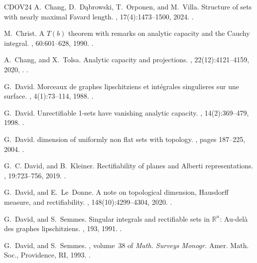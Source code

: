 \documentclass[11pt,reqno]{amsart}
\theoremstyle{definition}
\theoremstyle{remark}
\numberwithin{equation}{section}
\theoremstyle{theorem}
\theoremstyle{definition}
\theoremstyle{remark}
\numberwithin{equation}{section}
\begin{document}
\begin{thebibliography}{CDOV24}
	A.~Chang, D.~D{\k{a}}browski, T.~Orponen, and M.~Villa.
	\newblock Structure of sets with nearly maximal {Favard} length.
	, 17(4):1473--1500, 2024.
	\newblock {}.
	
	M.~Christ.
	\newblock A {$T(b)$} theorem with remarks on analytic capacity and the {Cauchy}
	integral.
	, 60:601--628, 1990.
	\newblock {}.
	
	A.~Chang, and X.~Tolsa.
	\newblock Analytic capacity and projections.
	, 22(12):4121--4159, 2020,
	.
	\newblock {}.
	
	G.~David.
	\newblock Morceaux de graphes lipschitziens et int{\'e}grales singulieres sur
	une surface.
	, 4(1):73--114, 1988.
	\newblock {}.
	
	G.~David.
	\newblock Unrectifiable 1-sets have vanishing analytic capacity.
	, 14(2):369--479, 1998.
	\newblock {}.
	
	G.~David.
	 dimension of uniformly non flat sets with topology.
	, pages 187--225, 2004.
	\newblock {}.
	
	G.~C. David, and B.~Kleiner.
	\newblock Rectifiability of planes and {Alberti representations}.
	, 19:723--756, 2019.
	\newblock {}.
	
	G.~David, and E.~Le~Donne.
	\newblock A note on topological dimension, {Hausdorff measure}, and
	rectifiability.
	, 148(10):4299--4304, 2020.
	\newblock {}.
	
	G.~David, and S.~Semmes.
	\newblock Singular integrals and rectifiable sets in {$\mathbb{R}^n$}:
	Au-del\`{a} des graphes lipschitziens.
	, 193, 1991.
	\newblock {}.
	
	G.~David, and S.~Semmes.
	, volume~38 of
	{\em Math. Surveys Monogr.}
	\newblock Amer. Math. Soc., Providence, RI, 1993.
	\newblock {}.
	

\end{thebibliography}
\end{document}
